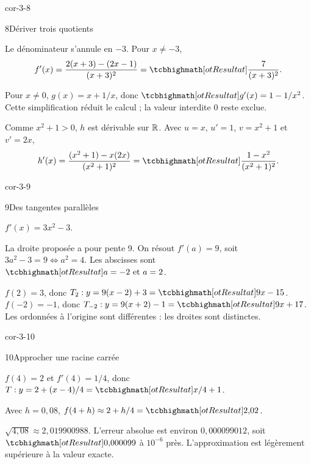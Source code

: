 \begin{blocLivre}{cor-3-8}
\begin{corrige}{8}{Dériver trois quotients}
\begin{questions}
\item Le dénominateur s’annule en $-3$. Pour $x\neq-3$,
\[f'(x)=\frac{2(x+3)-(2x-1)}{(x+3)^2}=\res{\frac7{(x+3)^2}}.\]
\item Pour $x\neq0$, $g(x)=x+1/x$, donc $\res{g'(x)=1-1/x^2}$.
Cette simplification réduit le calcul ; la valeur interdite 0 reste exclue.
\item Comme $x^2+1>0$, $h$ est dérivable sur $\mathbb{R}$.
Avec $u=x$, $u'=1$, $v=x^2+1$ et $v'=2x$,
\[h'(x)=\frac{(x^2+1)-x(2x)}{(x^2+1)^2}=\res{\frac{1-x^2}{(x^2+1)^2}}.\]
\end{questions}

\end{corrige}
\end{blocLivre}
\begin{blocLivre}{cor-3-9}
\begin{corrige}{9}{Des tangentes parallèles}
\begin{questions}
\item $f'(x)=3x^2-3$.
\item La droite proposée a pour pente 9. On résout $f'(a)=9$, soit
$3a^2-3=9\iff a^2=4$. Les abscisses sont $\res{a=-2\text{ et }a=2}$.
\item $f(2)=3$, donc $T_2:y=9(x-2)+3=\res{9x-15}$.
$f(-2)=-1$, donc $T_{-2}:y=9(x+2)-1=\res{9x+17}$.
Les ordonnées à l'origine sont différentes : les droites sont distinctes.
\end{questions}
\label{figlivre-r03-09-paralleles-cor}

\end{corrige}
\end{blocLivre}
\begin{blocLivre}{cor-3-10}
\begin{corrige}{10}{Approcher une racine carrée}
\begin{questions}
\item $f(4)=2$ et $f'(4)=1/4$, donc $T:y=2+(x-4)/4=\res{x/4+1}$.
\item Avec $h=0{,}08$, $f(4+h)\approx2+h/4=\res{2{,}02}$.
\item $\sqrt{4{,}08}\approx2{,}019900988$.
L'erreur absolue est environ $0{,}000099012$, soit $\res{0{,}000099}$ à $10^{-6}$ près.
L'approximation est légèrement supérieure à la valeur exacte.
\end{questions}
\end{corrige}
\end{blocLivre}

